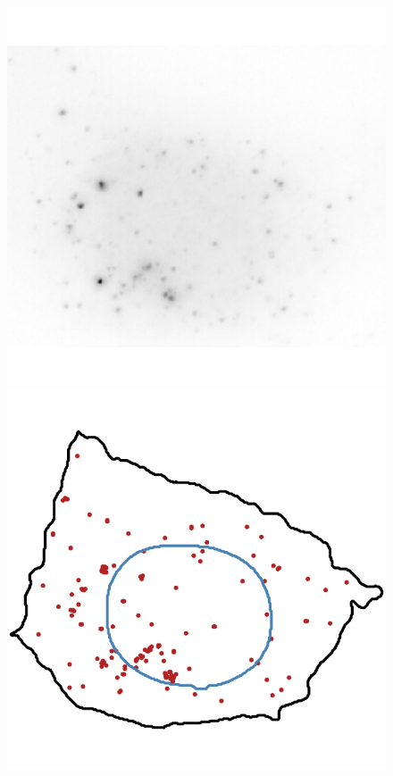 


\begin{figure}[]
	\centering
		\includegraphics[width=0.95\linewidth]{figures/introduction/real_image_foci}
		\vfill
		\includegraphics[width=0.95\linewidth]{figures/introduction/real_coord_foci}

\end{figure}
